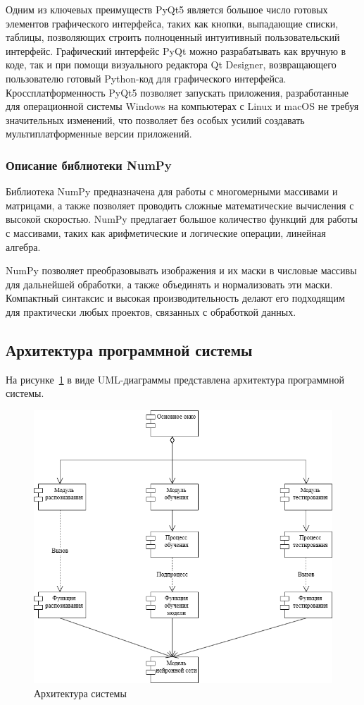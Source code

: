 Одним из ключевых преимуществ PyQt5 является большое число готовых элементов графического интерфейса, таких как кнопки, выпадающие списки, таблицы, позволяющих строить полноценный интуитивный пользовательский интерфейс. Графический интерфейс PyQt можно разрабатывать как вручную в коде, так и при помощи визуального редактора Qt Designer, возвращающего пользователю готовый Python-код для графического интерфейса. Кроссплатформенность PyQt5 позволяет запускать приложения, разработанные для операционной системы Windows на компьютерах с Linux и macOS не требуя значительных изменений, что позволяет без особых усилий создавать мультиплатформенные версии приложений.

\subsubsection{Описание библиотеки NumPy}

Библиотека NumPy предназначена для работы с многомерными массивами и матрицами, а также позволяет проводить сложные математические вычисления с высокой скоростью. NumPy предлагает большое количество функций для работы с массивами, таких как арифметические и логические операции, линейная алгебра. 

NumPy позволяет преобразовывать изображения и их маски в числовые массивы для дальнейшей обработки, а также объединять и нормализовать эти маски. Компактный синтаксис и высокая производительность делают его подходящим для практически любых проектов, связанных с обработкой данных\cite{bender_python}. 

\subsection{Архитектура программной системы}

На рисунке~\ref{fig:structure} в виде UML-диаграммы\cite{halyapin_uml} представлена архитектура программной системы.  

\begin{figure}[h]
	\centering
	\includegraphics[width=0.7\linewidth]{images/компоненты}
	\caption{Архитектура системы}
	\label{fig:structure}
\end{figure}

